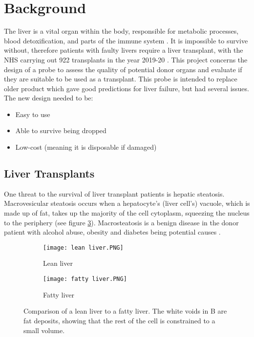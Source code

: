 \section{Background}

The liver is a vital organ within the body, responsible for metabolic processes, blood detoxification, and parts of the immune system \cite{liver_background}. It is impossible to survive without, therefore patients with faulty livers require a liver transplant, with the NHS carrying out 922 transplants in the year 2019-20 \cite{nhs_transplants}. This project concerns the design of a probe to assess the quality of potential donor organs and evaluate if they are suitable to be used as a transplant. This probe is intended to replace older product which gave good predictions for liver failure, but had several issues. The new design needed to be:

\begin{itemize}[noitemsep, nolistsep]
\item Easy to use
\item Able to survive being dropped
\item Low-cost (meaning it is disposable if damaged)
\end{itemize}


\subsection{Liver Transplants}
One threat to the survival of liver transplant patients is hepatic steatosis. Macrovesicular steatosis occurs when a hepatocyte’s (liver cell’s) vacuole, which is made up of fat, takes up the majority of the cell cytoplasm, squeezing the nucleus to the periphery \cite{Imber2002} (see figure \ref{fig: livers}). Macrosteatosis is a benign disease in the donor patient \cite{Imber2002} with alcohol abuse, obesity and diabetes being potential causes \cite{Imber2002}.\\

\begin{figure}[htbp]
	\centering
	\begin{subfigure}[b]{0.4\linewidth}
		\texttt{[image: lean liver.PNG]}
		\caption{Lean liver \cite{Bruno2008}}
		\label{}
	\end{subfigure}
	\begin{subfigure}[b]{0.4\linewidth}
		\texttt{[image: fatty liver.PNG]}
		\caption{Fatty liver \cite{Bruno2008}}
		\label{fig: fatty liver}
	\end{subfigure}
	\caption{Comparison of a lean liver to a fatty liver. The white voids in B are fat deposits, showing that the rest of the cell is constrained to a small volume.}
	\label{fig: livers}
\end{figure}	


